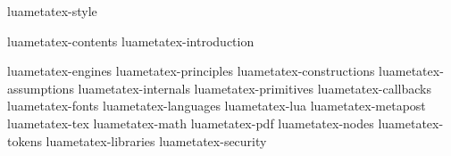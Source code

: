 

\environment luametatex-style


\setupalign
  [depth]

\setuplayout
  [vz=2]

\setuptyping
  [align=hangright,
   keeptogether=yes,
   numbering=]


\startdocument[title=luametatex,alternative=manual]

\startfrontmatter
    \component luametatex-contents
    \component luametatex-introduction
\stopfrontmatter

\startbodymatter
    \component luametatex-engines
    \component luametatex-principles
    \component luametatex-constructions
    \component luametatex-assumptions
    \component luametatex-internals
    \component luametatex-primitives
    \component luametatex-callbacks
    \component luametatex-fonts
    \component luametatex-languages
    \component luametatex-lua
    \component luametatex-metapost
    \component luametatex-tex
    \component luametatex-math
    \component luametatex-pdf
    \component luametatex-nodes
    \component luametatex-tokens
    \component luametatex-libraries
    \component luametatex-security
\stopbodymatter

\stopdocument

